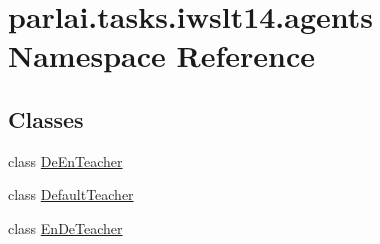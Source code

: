 \hypertarget{namespaceparlai_1_1tasks_1_1iwslt14_1_1agents}{}\section{parlai.\+tasks.\+iwslt14.\+agents Namespace Reference}
\label{namespaceparlai_1_1tasks_1_1iwslt14_1_1agents}
\subsection*{Classes}
\begin{DoxyCompactItemize}
\item 
class \hyperlink{classparlai_1_1tasks_1_1iwslt14_1_1agents_1_1DeEnTeacher}{De\+En\+Teacher}
\item 
class \hyperlink{classparlai_1_1tasks_1_1iwslt14_1_1agents_1_1DefaultTeacher}{Default\+Teacher}
\item 
class \hyperlink{classparlai_1_1tasks_1_1iwslt14_1_1agents_1_1EnDeTeacher}{En\+De\+Teacher}
\end{DoxyCompactItemize}
